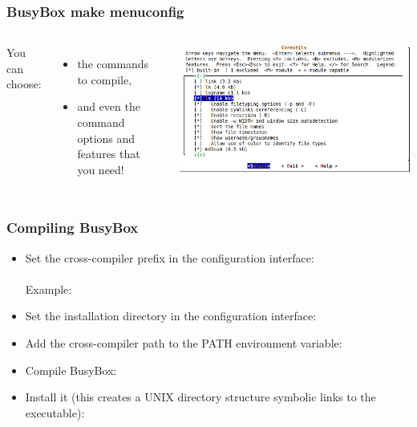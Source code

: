\begin{frame}
  \frametitle{BusyBox make menuconfig}
  \begin{columns}
    You can choose:
    \begin{itemize}
    \item the commands to compile,
    \item and even the command options and features that you need!
    \end{itemize}
    \includegraphics[width=\textwidth]{slides/sysdev-busybox/menuconfig-screenshot.png}
  \end{columns}
\end{frame}

\begin{frame}
  \frametitle{Compiling BusyBox}
  \begin{itemize}
  \item Set the cross-compiler prefix in the configuration interface: \\
    \\
    Example: 
  \item Set the installation directory in the configuration interface: \\
  \item Add the cross-compiler path to the PATH environment variable:\\
  \item Compile BusyBox:\\
  \item Install it (this creates a UNIX directory structure symbolic
    links to the  executable):\\
  \end{itemize}
\end{frame}


